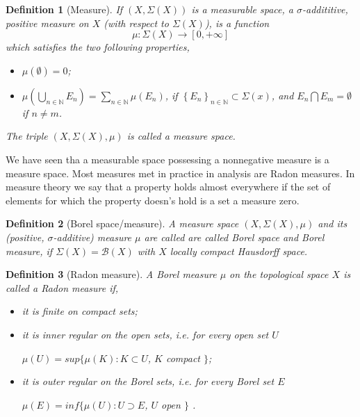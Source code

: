 \documentclass[10pt]{book}
\theoremstyle{break}
\newtheorem{definition}{Definition}
\begin{document}
\begin{definition}[Measure]
If $(X, \Sigma(X))$ is a measurable space, a $\sigma$-addititive, positive measure on $X$ (with respect to $\Sigma(X)$), is a function 
\begin{equation}
\mu : \Sigma(X) \to [0,+\infty] 
\end{equation}
which satisfies the two following properties,
\begin{itemize}
\item $\mu(\emptyset) = 0$;
\item $\mu( \underset{n \in \mathbb{N}}{\bigcup} E_n ) = \underset{n \in \mathbb{N}}{\sum} \mu(E_n)$, if $\left\{E_n\right\}_{n\in\mathbb{N}} \subset \Sigma(x)$, and $E_n \bigcap E_m = \emptyset$ if $n\neq m$.
\end{itemize}
The triple $(X,\Sigma(X),\mu)$ is called a measure space.
\end{definition}


We have seen tha a measurable space possessing a nonnegative measure is a measure space. Most measures met in practice in analysis are Radon measures. In measure theory we say that a property holds almost everywhere if the set of elements for which the property doesn's hold is a set a measure zero.


\begin{definition}[Borel space/measure]
A measure space $(X, \Sigma(X), \mu)$ and its (positive, $\sigma$-additive) measure $\mu$ are called are called Borel space and Borel measure, if $\Sigma(X) = \mathcal{B}(X)$ with $X$ locally compact Hausdorff space.
\end{definition}


\begin{definition}[Radon measure]
A Borel measure $\mu$ on the topological space $X$ is called a Radon measure if, 
\begin{itemize}
\item it is finite on compact sets;
\item it is inner regular on the open sets, i.e. for every open set $U$ 
\begin{center}
$\mu(U) = sup\big\{\mu(K) : K \subset U$, $K$ compact $\big\}$;
\end{center}
\item it is outer regular on the Borel sets, i.e. for every Borel set $E$
\begin{center}
$\mu(E) = inf\big\{\mu(U) : U \supset E$, $U$ open $\big\}$ .
\end{center}
\end{itemize}
\end{definition}
\end{document}
